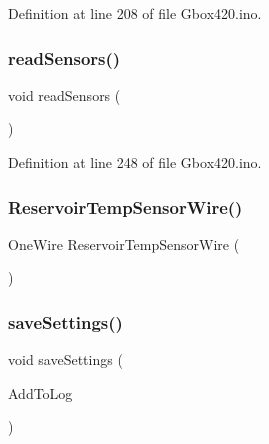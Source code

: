 Definition at line 208 of file Gbox420.\+ino.

\mbox{\label{_gbox420_8ino_ad40ccf803c2eff76d7e0e7a24c9937ef}} 
\subsubsection{\texorpdfstring{readSensors()}{readSensors()}}
{\footnotesize\ttfamily void read\+Sensors (\begin{DoxyParamCaption}{ }\end{DoxyParamCaption})}



Definition at line 248 of file Gbox420.\+ino.

\mbox{\label{_gbox420_8ino_a34e274782a1598e7e41f428d47e47e5e}} 
\subsubsection{\texorpdfstring{ReservoirTempSensorWire()}{ReservoirTempSensorWire()}}
{\footnotesize\ttfamily One\+Wire Reservoir\+Temp\+Sensor\+Wire (\begin{DoxyParamCaption}\item[{\mbox{\hyperlink{420_pins_8h_a5e2eca6269f00e18c7e02293e21489ed}{Reservoir\+Temp\+Sensor\+In\+Pin}}}]{ }\end{DoxyParamCaption})}

\mbox{\label{_gbox420_8ino_a4f17eb8b1a9b3bdb588e9d7ae4b93710}} 
\subsubsection{\texorpdfstring{saveSettings()}{saveSettings()}}
{\footnotesize\ttfamily void save\+Settings (\begin{DoxyParamCaption}\item[{bool}]{Add\+To\+Log }\end{DoxyParamCaption})}



